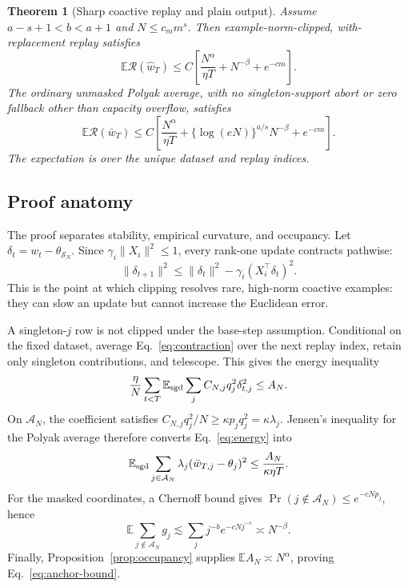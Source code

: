 \documentclass[letterpaper]{article}
\newtheorem{theorem}{Theorem}
\newcommand{\E}{\mathbb E}
\newcommand{\R}{\mathcal R}
\newcommand{\cA}{\mathcal A}
\newcommand{\cS}{\mathcal S}
\begin{document}
\begin{theorem}[Sharp coactive replay and plain output]
\label{thm:coactive}
Assume $a-s+1<b<a+1$ and $N\le c_mm^s$. Then example-norm-clipped,
with-replacement replay satisfies
\begin{equation}
\E\R(\widehat w_T)
\le C\left[
\frac{N^\alpha}{\eta T}+N^{-\beta}+e^{-cm}
\right].
\label{eq:anchor-bound}
\end{equation}
The ordinary unmasked Polyak average, with no singleton-support abort or zero
fallback other than capacity overflow, satisfies
\begin{equation}
\E\R(\bar w_T)
\le C\left[
\frac{N^\alpha}{\eta T}
+\{\log(eN)\}^{a/s}N^{-\beta}
+e^{-cm}
\right].
\label{eq:plain-bound}
\end{equation}
The expectation is over the unique dataset and replay indices.
\end{theorem}

\subsection{Proof anatomy}

The proof separates stability, empirical curvature, and occupancy. Let
$\delta_t=w_t-\theta_{\cS_N}$. Since
$\gamma_i\|X_i\|^2\le1$, every rank-one update contracts pathwise:
\begin{equation}
\|\delta_{t+1}\|^2
\le \|\delta_t\|^2-\gamma_i(X_i^\top\delta_t)^2.
\label{eq:contraction}
\end{equation}
This is the point at which clipping resolves rare, high-norm coactive examples:
they can slow an update but cannot increase the Euclidean error.

A singleton-$j$ row is not clipped under the base-step assumption. Conditional
on the fixed dataset, average Eq.~\eqref{eq:contraction} over the next replay
index, retain only singleton contributions, and telescope. This gives the
energy inequality
\begin{equation}
\frac{\eta}{N}\sum_{t<T}\E_{\rm sgd}
\sum_j C_{N,j}q_j^2\delta_{t,j}^2
\le A_N.
\label{eq:energy}
\end{equation}
On $\cA_N$, the coefficient satisfies
$C_{N,j}q_j^2/N\ge\kappa p_jq_j^2=\kappa\lambda_j$. Jensen's inequality for the
Polyak average therefore converts Eq.~\eqref{eq:energy} into
\[
\E_{\rm sgd}\sum_{j\in\cA_N}\lambda_j
(\bar w_{T,j}-\theta_j)^2
\le \frac{A_N}{\kappa\eta T}.
\]
For the masked coordinates, a Chernoff bound gives
$\Pr(j\notin\cA_N)\le e^{-cNp_j}$, hence
\[
\E\sum_{j\notin\cA_N}g_j
\lesssim\sum_jj^{-b}e^{-cNj^{-s}}
\asymp N^{-\beta}.
\]
Finally, Proposition~\ref{prop:occupancy} supplies
$\E A_N\asymp N^\alpha$, proving Eq.~\eqref{eq:anchor-bound}.
\end{document}
